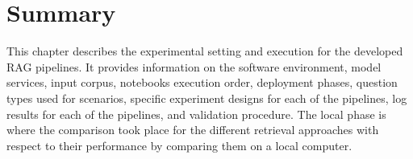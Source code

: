 
\section{Summary}
This chapter describes the experimental setting and execution for the developed \ac{RAG} pipelines. It provides information on the software environment, model services, input corpus, notebooks execution order, deployment phases, question types used for scenarios, specific experiment designs for each of the pipelines, log results for each of the pipelines, and validation procedure. The local phase is where the comparison took place for the different retrieval approaches with respect to their performance by comparing them on a local computer. 

